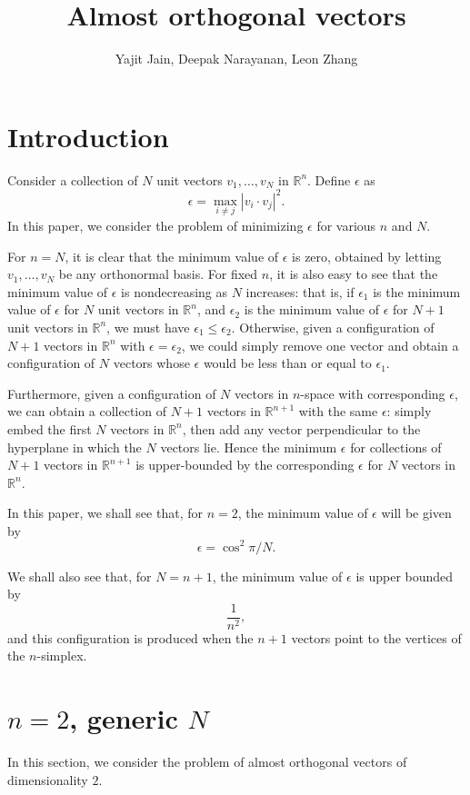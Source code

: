 \documentclass[11pt,letterpaper,twoside,english]{article}
\title{Almost orthogonal vectors}
\author{Yajit Jain, Deepak Narayanan, Leon Zhang}
\theoremstyle{theorem}
\theoremstyle{remark}
\begin{document}
\maketitle

\section{Introduction}
Consider a collection of $N$ unit vectors $v_1, \ldots, v_N$ in $\mathbb R^n$. Define $\epsilon$ as
\[\epsilon=\max_{i\neq j}|v_i\cdot v_j|^2.\]
In this paper, we consider the problem of minimizing $\epsilon$ for various $n$ and $N$.

For $n=N$, it is clear that the minimum value of $\epsilon$ is zero, obtained by letting $v_1,\ldots, v_N$ be any orthonormal basis. For fixed $n$, it is also easy to see that the minimum value of $\epsilon$ is nondecreasing as $N$ increases: that is, if $\epsilon_1$ is the minimum value of $\epsilon$ for $N$ unit vectors in $\mathbb R^n$, and $\epsilon_2$ is the minimum value of $\epsilon$ for $N+1$ unit vectors in $\mathbb R^n$, we must have $\epsilon_1\leq \epsilon_2$. Otherwise, given a configuration of $N+1$ vectors in $\mathbb R^n$ with $\epsilon=\epsilon_2$, we could simply remove one vector and obtain a configuration of $N$ vectors whose $\epsilon$ would be less than or equal to $\epsilon_1$.

Furthermore, given a configuration of $N$ vectors in $n$-space with corresponding $\epsilon$, we can obtain a collection of $N+1$ vectors in $\mathbb R^{n+1}$ with the same $\epsilon$: simply embed the first $N$ vectors in $\mathbb R^{n}$, then add any vector perpendicular to the hyperplane in which the $N$ vectors lie. Hence the minimum $\epsilon$ for collections of $N+1$ vectors in $\mathbb R^{n+1}$ is upper-bounded by the corresponding $\epsilon$ for $N$ vectors in $\mathbb R^n$.

In this paper, we shall see that, for $n=2$, the minimum value of $\epsilon$ will be given by 
\[\epsilon=\cos^2\pi/N.\] 

We shall also see that, for $N=n+1$, the minimum value of $\epsilon$ is upper bounded by
\[\frac{1}{n^2},\] 
and this configuration is produced when the $n+1$ vectors point to the vertices of the $n$-simplex.

\section{$n=2$, generic $N$}
In this section, we consider the problem of almost orthogonal vectors of dimensionality $2$.
\end{document}
